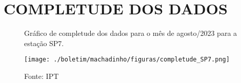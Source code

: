 \section{COMPLETUDE DOS DADOS}

\begin{figure}[htb!]
    \centering
	\captionsetup{justification=raggedright, singlelinecheck=false, width=1\textwidth}
    \caption{Gráfico de completude dos dados para o mês de agosto/2023 para a estação SP7.}
    \begin{mdframed}[
        linecolor=black,
        linewidth=1pt,
        roundcorner=10pt,
    ]
    \texttt{[image: ./boletim/machadinho/figuras/completude\_SP7.png]} %
    \end{mdframed}
    \caption*{Fonte: IPT}
    \label{fig:completude}
\end{figure}

